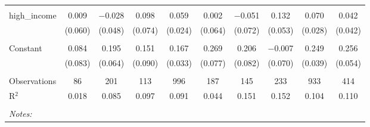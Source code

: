 \begin{table}[!htbp]
\begin{tabular}{@{\extracolsep{5pt}}lccccccccc}
  & & & & & & & & & \\ 
 high\_income & 0.009 & $-$0.028 & 0.098 & 0.059 & 0.002 & $-$0.051 & 0.132 & 0.070 & 0.042 \\ 
  & (0.060) & (0.048) & (0.074) & (0.024) & (0.064) & (0.072) & (0.053) & (0.028) & (0.042) \\ 
  & & & & & & & & & \\ 
 Constant & 0.084 & 0.195 & 0.151 & 0.167 & 0.269 & 0.206 & $-$0.007 & 0.249 & 0.256 \\ 
  & (0.083) & (0.064) & (0.090) & (0.033) & (0.077) & (0.082) & (0.070) & (0.039) & (0.054) \\ 
  & & & & & & & & & \\ 
Observations & 86 & 201 & 113 & 996 & 187 & 145 & 233 & 933 & 414 \\ 
R$^{2}$ & 0.018 & 0.085 & 0.097 & 0.091 & 0.044 & 0.151 & 0.152 & 0.104 & 0.110 \\ 
\hline \\[-1.8ex] 
\textit{Notes:} & \multicolumn{9}{l}{} \\ 
\end{tabular} 
\end{table} 
